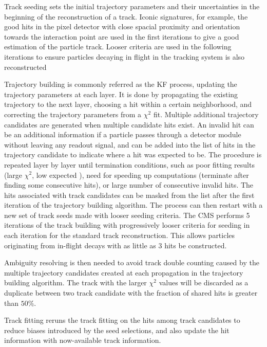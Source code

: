 Track seeding sets the initial trajectory parameters and their uncertainties in the beginning of the reconstruction of a track.
Iconic signatures, for example, the good hits in the pixel detector with close spacial proximity and orientation towards the interaction point are used in the first iterations to give a good estimation of the particle track.
Looser criteria are used in the following iterations to ensure particles decaying in flight in the tracking system is also reconstructed

Trajectory building is commonly referred as the KF process, updating the trajectory parameters at each layer.
It is done by propagating the existing trajectory to the next layer, choosing a hit within a certain neighborhood, and correcting the trajectory parameters from a $\chi^2$ fit.
Multiple additional trajectory candidates are generated when multiple candidate hits exist.
An invalid hit can be an additional information if a particle passes through a detector module without leaving any readout signal, and can be added into the list of hits in the trajectory candidate to indicate where a hit was expected to be.
The procedure is repeated layer by layer until termination conditions, such as poor fitting results (large $\chi^2$, low expected \PT), need for speeding up computations (terminate after finding some consecutive hits), or large number of consecutive invalid hits. 
The hits associated with track candidates can be masked from the list after the first iteration of the trajectory building algorithm.
The process can then restart with a new set of track seeds made with looser seeding criteria.
The CMS performs 5 iterations of the track building with progressively looser criteria for seeding in each iteration for the standard track reconstruction.
This allows particles originating from in-flight decays with as little as 3 hits be constructed.

Ambiguity resolving is then needed to avoid track double counting caused by the multiple trajectory candidates created at each propagation in the trajectory building algorithm.
The track with the larger $\chi^2$ values will be discarded as a duplicate between two track candidate with the fraction of shared hits is greater than $50\%$.

Track fitting reruns the track fitting on the hits among track candidates to reduce biases introduced by the seed selections, and also update the hit information with now-available track information.

